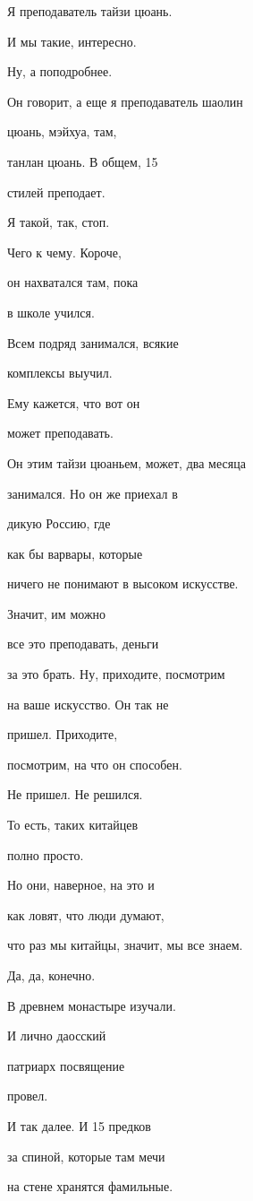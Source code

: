 Я преподаватель тайзи цюань.

И мы такие, интересно.

Ну, а поподробнее.

Он говорит, а еще я преподаватель шаолин

цюань, мэйхуа, там,

танлан цюань. В общем, 15

стилей преподает.

Я такой, так, стоп.

Чего к чему. Короче,

он нахватался там, пока

в школе учился.

Всем подряд занимался, всякие

комплексы выучил.

Ему кажется, что вот он

может преподавать.

Он этим тайзи цюаньем, может, два месяца

занимался. Но он же приехал в

дикую Россию, где

как бы варвары, которые

ничего не понимают в высоком искусстве.

Значит, им можно

все это преподавать, деньги

за это брать. Ну, приходите, посмотрим

на ваше искусство. Он так не

пришел. Приходите,

посмотрим, на что он способен.

Не пришел. Не решился.

То есть, таких китайцев

полно просто.

Но они, наверное, на это и

как ловят, что люди думают,

что раз мы китайцы, значит, мы все знаем.

Да, да, конечно.

В древнем монастыре изучали.

И лично даосский

патриарх посвящение

провел.

И так далее. И 15 предков

за спиной, которые там мечи

на стене хранятся фамильные.

